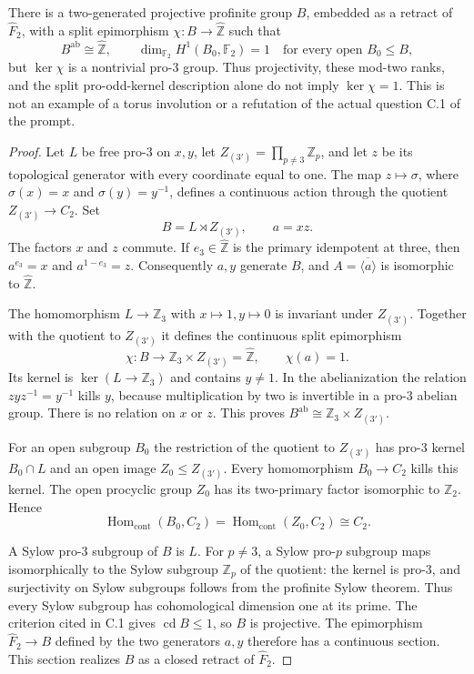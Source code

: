 There is a two-generated projective profinite group $B$, embedded as a
retract of $\widehat F_2$, with a split epimorphism
$\chi:B\to\widehat{\mathbb Z}$ such that
\[
 B^{\mathrm{ab}}\cong\widehat{\mathbb Z},\qquad
 \dim_{\mathbb F_2}H^1(B_0,\mathbb F_2)=1
       \quad\text{for every open }B_0\leq B,
\]
but $\ker\chi$ is a nontrivial pro-$3$ group.  Thus projectivity,
these mod-two ranks, and the split pro-odd-kernel description alone
do not imply $\ker\chi=1$.  This is not an example of a torus
involution or a refutation of the actual question C.1 of the prompt.

\begin{proof}
Let $L$ be free pro-$3$ on $x,y$, let
$Z_{(3')}=\prod_{p\ne3}\mathbb Z_p$, and let $z$ be its
topological generator with every coordinate equal to one.  The map
$z\mapsto\sigma$, where $\sigma(x)=x$ and $\sigma(y)=y^{-1}$,
defines a continuous action through the quotient
$Z_{(3')}\to C_2$.  Set
\[
 B=L\rtimes Z_{(3')},\qquad a=xz.
\]
The factors $x$ and $z$ commute.  If $e_3\in\widehat{\mathbb Z}$
is the primary idempotent at three, then
$a^{e_3}=x$ and $a^{1-e_3}=z$.  Consequently $a,y$ generate $B$,
and $A=\overline{\langle a\rangle}$ is isomorphic to
$\widehat{\mathbb Z}$.

The homomorphism $L\to\mathbb Z_3$ with $x\mapsto1,y\mapsto0$
is invariant under $Z_{(3')}$.  Together with the quotient to
$Z_{(3')}$ it defines the continuous split epimorphism
\[
 \chi:B\longrightarrow\mathbb Z_3\times Z_{(3')}
                  =\widehat{\mathbb Z},\qquad \chi(a)=1.
\]
Its kernel is $\ker(L\to\mathbb Z_3)$ and contains $y\ne1$.
In the abelianization the relation $zyz^{-1}=y^{-1}$ kills $y$,
because multiplication by two is invertible in a pro-$3$ abelian
group.  There is no relation on $x$ or $z$.  This proves
$B^{\mathrm{ab}}\cong\mathbb Z_3\times Z_{(3')}$.

For an open subgroup $B_0$ the restriction of the quotient to
$Z_{(3')}$ has pro-$3$ kernel $B_0\cap L$ and an open image
$Z_0\leq Z_{(3')}$.  Every homomorphism $B_0\to C_2$ kills
this kernel.  The open procyclic group $Z_0$ has its two-primary
factor isomorphic to $\mathbb Z_2$.  Hence
\[
 \operatorname{Hom}_{\mathrm{cont}}(B_0,C_2)
 =\operatorname{Hom}_{\mathrm{cont}}(Z_0,C_2)\cong C_2.
\]

A Sylow pro-$3$ subgroup of $B$ is $L$.  For $p\ne3$, a Sylow
pro-$p$ subgroup maps isomorphically to the Sylow subgroup
$\mathbb Z_p$ of the quotient: the kernel is pro-$3$, and
surjectivity on Sylow subgroups follows from the profinite Sylow
theorem.  Thus every Sylow subgroup has cohomological dimension
one at its prime.  The criterion cited in C.1 gives
$\operatorname{cd}B\leq1$, so $B$ is projective.  The epimorphism
$\widehat F_2\to B$ defined by the two generators $a,y$ therefore
has a continuous section.  This section realizes $B$ as a closed
retract of $\widehat F_2$.


\end{proof}

